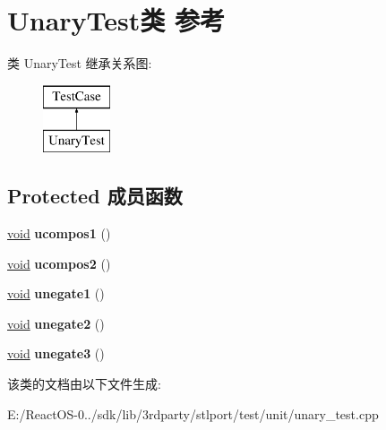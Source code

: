 \hypertarget{class_unary_test}{}\section{Unary\+Test类 参考}
\label{class_unary_test}
类 Unary\+Test 继承关系图\+:\begin{figure}[H]
\begin{center}
\leavevmode
\includegraphics[height=2.000000cm]{class_unary_test}
\end{center}
\end{figure}
\subsection*{Protected 成员函数}
\begin{DoxyCompactItemize}
\item 
\mbox{\label{class_unary_test_a672302be81b907fe8908e146c54c2698}} 
\hyperlink{interfacevoid}{void} {\bfseries ucompos1} ()
\item 
\mbox{\label{class_unary_test_a6ea013bdd671145eac2a1e4d15ce1f76}} 
\hyperlink{interfacevoid}{void} {\bfseries ucompos2} ()
\item 
\mbox{\label{class_unary_test_a334d27afb60ca42700eefa1cf936b9de}} 
\hyperlink{interfacevoid}{void} {\bfseries unegate1} ()
\item 
\mbox{\label{class_unary_test_a203112b113b0b983fba07d111cb94454}} 
\hyperlink{interfacevoid}{void} {\bfseries unegate2} ()
\item 
\mbox{\label{class_unary_test_adfa5bd625116f1ded943b2c54c2af535}} 
\hyperlink{interfacevoid}{void} {\bfseries unegate3} ()
\end{DoxyCompactItemize}


该类的文档由以下文件生成\+:\begin{DoxyCompactItemize}
\item 
E\+:/\+React\+O\+S-\/0../sdk/lib/3rdparty/stlport/test/unit/unary\+\_\+test.\+cpp\end{DoxyCompactItemize}
